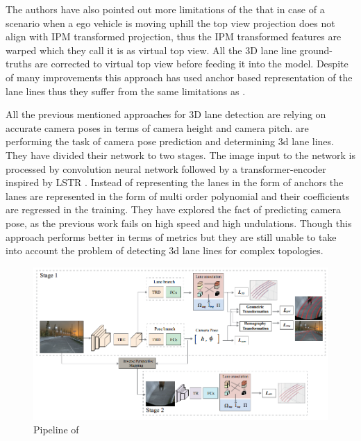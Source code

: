 The authors have also pointed out more limitations of the \cite{DBLP:journals/corr/abs-1811-10203} that in case of a scenario when a ego vehicle is moving uphill the top view projection does not align with IPM transformed projection, thus the IPM transformed features are warped which they call it is as virtual top view. All the 3D lane line ground-truths are corrected to virtual top view before feeding it into the model. Despite of many improvements this approach has used anchor based representation of the lane lines thus they suffer from the same limitations as \cite{DBLP:journals/corr/abs-1811-10203}. 

All the previous mentioned approaches for 3D lane detection are relying on accurate camera poses in terms of camera height and camera pitch. \cite{DBLP:journals/corr/abs-2112-15351} are performing the task of camera pose prediction and determining 3d lane lines. They have divided their network to two stages. The image input to the network is processed by convolution neural network followed by a transformer-encoder inspired by LSTR \cite{LSTR}. Instead of representing the lanes in the form of anchors the lanes are represented in the form of multi order polynomial and their coefficients are regressed in the training. They have explored the fact of predicting camera pose, as the previous work fails on high speed and high undulations. Though this approach performs better in terms of metrics but they are still unable to take into account the problem of detecting 3d lane lines for complex topologies. 

 \begin{figure}[h]
    \centering
    \includegraphics[width=\textwidth]{images/3dLane_camera_pose_pipeline.png}
    \caption{Pipeline of \cite{DBLP:journals/corr/abs-2112-15351}}
    \end{figure}

